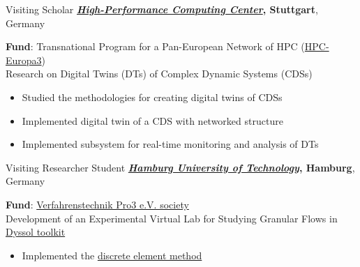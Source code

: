 \documentclass[
  a4paper
]{../FortySecondsCV/fortysecondscv}
\renewcommand{\emph}[1]{\textcolor{cyan!75!black!120}{\textbf{#1}}}
\begin{document}
\begin{cvtable}[1]
{{            
          }
         }
         {Visiting Scholar}
         {\emph{\href{http://www.hlrs.de}{{\it High-Performance Computing Center}}, Stuttgart}, Germany}%
         {
          {\scriptsize \emph{Fund}: { Transnational Program for a Pan-European Network of HPC} (\href{http://www.hpc-europa.eu/}{HPC-Europa3})}\\
          Research on Digital Twins (DTs) of Complex Dynamic Systems (CDSs)
          {\footnotesize \setlength\parindent{0pt}\setlength{\parskip}{-1.em}
            \begin{itemize}[leftmargin=*]\setlength\itemsep{-.5em}
            \item Studied the methodologies for creating digital twins of CDSs
            \item Implemented digital twin of a CDS with networked structure
            \item Implemented subsystem for real-time monitoring and analysis of DTs
            \end{itemize}
          }
          {\scriptsize
          } %
         }
         {Visiting Researcher Student}
         {\emph{\href{https://www.tuhh.de}{{\it Hamburg University of Technology}}, Hamburg}, Germany}%
         {
          {\scriptsize \emph{Fund}: { \href{https://verfahrenstechnik-pro3.de/}{Verfahrenstechnik Pro3 e.V. society}}}\\
          Development of an Experimental Virtual Lab for Studying Granular Flows
          in \href{https://www.dyssoltec.com/the-software}{Dyssol toolkit}
          {\footnotesize \setlength\parindent{0pt}\setlength{\parskip}{-1.em}
            \begin{itemize}[leftmargin=*]\setlength\itemsep{-.5em}
              \item 
              Implemented the \href{https://en.wikipedia.org/wiki/Discrete_element_method}{discrete element method}

\end{itemize}}}
\end{cvtable}
\end{document}
